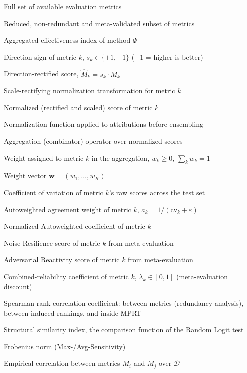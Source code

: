 \begin{description}[leftmargin=3.4cm]
    \item[$\{M_1,\dots,M_K\}$] Full set of available evaluation metrics
    \item[$M^{*}$] Reduced, non-redundant and meta-validated subset of metrics
    \item[$E(\Phi)$] Aggregated effectiveness index of method $\Phi$
    \item[$s_k$] Direction sign of metric $k$, $s_k \in \{+1, -1\}$ ($+1$ = higher-is-better)
    \item[$\hat{M}_k$] Direction-rectified score, $\hat{M}_k = s_k \cdot M_k$
    \item[$\psi_k$] Scale-rectifying normalization transformation for metric $k$
    \item[$\tilde{M}_k$] Normalized (rectified and scaled) score of metric $k$
    \item[$\mathcal{N}$] Normalization function applied to attributions before ensembling
    \item[$\mathcal{A}$] Aggregation (combinator) operator over normalized scores
    \item[$w_k$] Weight assigned to metric $k$ in the aggregation, $w_k \geq 0$, $\sum_k w_k = 1$
    \item[$\mathbf{w}$] Weight vector $\mathbf{w} = (w_1, \dots, w_K)$
    \item[$\mathrm{cv}_k$] Coefficient of variation of metric $k$'s raw scores across the test set
    \item[$a_k$] Autoweighted agreement weight of metric $k$, $a_k = 1/(\mathrm{cv}_k + \varepsilon)$
    \item[$w_k^{\mathrm{AW}}$] Normalized Autoweighted coefficient of metric $k$
    \item[$\mathrm{NR}_k$] Noise Resilience score of metric $k$ from meta-evaluation
    \item[$\mathrm{AR}_k$] Adversarial Reactivity score of metric $k$ from meta-evaluation
    \item[$\lambda_k$] Combined-reliability coefficient of metric $k$, $\lambda_k \in [0,1]$ (meta-evaluation discount)
    \item[$\rho$] Spearman rank-correlation coefficient: between metrics (redundancy analysis), between induced rankings, and inside MPRT
    \item[$\mathrm{SSIM}$] Structural similarity index, the comparison function of the Random Logit test
    \item[$\|\cdot\|_F$] Frobenius norm (Max-/Avg-Sensitivity)
    \item[$\rho_{ij}$] Empirical correlation between metrics $M_i$ and $M_j$ over $\mathcal{D}$

\end{description}
